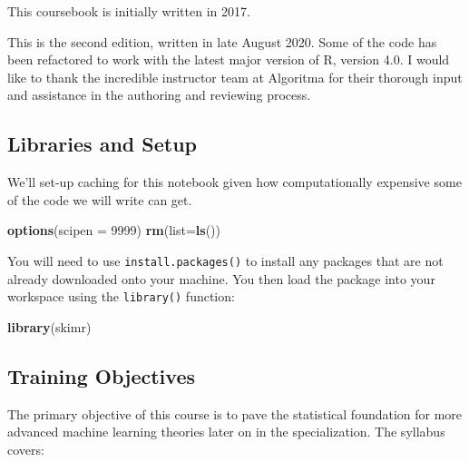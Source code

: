\documentclass[]{article}
\newenvironment{Shaded}{\begin{snugshade}}{\end{snugshade}}
\newcommand{\DataTypeTok}[1]{\textcolor[rgb]{0.13,0.29,0.53}{#1}}
\newcommand{\DecValTok}[1]{\textcolor[rgb]{0.00,0.00,0.81}{#1}}
\newcommand{\KeywordTok}[1]{\textcolor[rgb]{0.13,0.29,0.53}{\textbf{#1}}}
\newcommand{\NormalTok}[1]{#1}
\begin{document}
This coursebook is initially written in 2017.

This is the second edition, written in late August 2020. Some of the
code has been refactored to work with the latest major version of R,
version 4.0. I would like to thank the incredible instructor team at
Algoritma for their thorough input and assistance in the authoring and
reviewing process.

\hypertarget{libraries-and-setup}{%
\subsection{Libraries and Setup}\label{libraries-and-setup}}

We'll set-up caching for this notebook given how computationally
expensive some of the code we will write can get.

\begin{Shaded}
\begin{Highlighting}[]
\KeywordTok{options}\NormalTok{(}\DataTypeTok{scipen =} \DecValTok{9999}\NormalTok{)}
\KeywordTok{rm}\NormalTok{(}\DataTypeTok{list=}\KeywordTok{ls}\NormalTok{())}
\end{Highlighting}
\end{Shaded}

You will need to use \texttt{install.packages()} to install any packages
that are not already downloaded onto your machine. You then load the
package into your workspace using the \texttt{library()} function:

\begin{Shaded}
\begin{Highlighting}[]
\KeywordTok{library}\NormalTok{(skimr)}
\end{Highlighting}
\end{Shaded}

\hypertarget{training-objectives}{%
\subsection{Training Objectives}\label{training-objectives}}

The primary objective of this course is to pave the statistical
foundation for more advanced machine learning theories later on in the
specialization. The syllabus covers:
\end{document}
